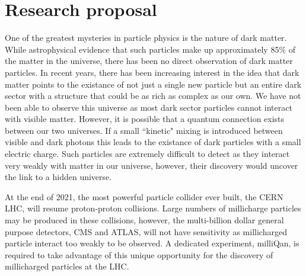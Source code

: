 \documentclass[11pt]{article}
\theoremstyle{plain} \numberwithin{equation}{section}
\theoremstyle{definition}
\begin{document}
\section*{Research proposal}
\noindent 

%

One of the greatest mysteries in particle physics is the nature of dark matter.
While astrophysical evidence that such particles make up approximately 85\% of the matter
in the universe, there has been no direct observation of dark matter particles. In recent years, 
there has been increasing interest in the idea that dark matter points to the 
existance of not just a single new particle but an entire dark sector 
with a structure that could be as rich as complex as our own. We have not been able to
observe this universe as most dark sector particles cannot interact with
visible matter. However, it is possible that a quantum connection exists between our two universes. 
If a small ``kinetic" mixing is introduced between visible and dark photons this
leads to the existance of dark particles with a small electric charge.
Such particles are extremely difficult to detect as they interact very weakly with
matter in our universe, however, their discovery would uncover the link to 
a hidden universe.

At the end of 2021, the most powerful particle collider ever built, the CERN LHC, 
will resume proton-proton collisions. Large numbers of millicharge particles may be 
produced in these collisions, however, the multi-billion dollar general purpose
detectors, CMS and ATLAS, will not have sensitivity as millicharged particle interact
too weakly to be observed. A dedicated experiment, milliQan, is required to take advantage of 
this unique opportunity for the discovery of millicharged particles at the LHC.
\end{document}
